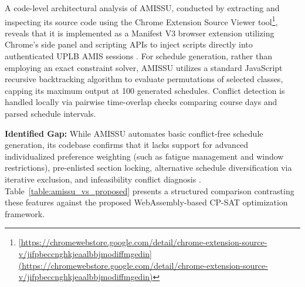 \documentclass{icsthesis}
\begin{document}
\begin{mainmatter}
		A code-level architectural analysis of AMISSU, conducted by extracting and inspecting its source code using the Chrome Extension Source Viewer tool\footnote{\url{[https://chromewebstore.google.com/detail/chrome-extension-source-v/jifpbeccnghkjeaalbbjmodiffmgedin](https://chromewebstore.google.com/detail/chrome-extension-source-v/jifpbeccnghkjeaalbbjmodiffmgedin)}}, reveals that it is implemented as a Manifest V3 browser extension utilizing Chrome's side panel and scripting APIs to inject scripts directly into authenticated UPLB AMIS sessions \citep{amissu2023}. For schedule generation, rather than employing an exact constraint solver, AMISSU utilizes a standard JavaScript recursive backtracking algorithm to evaluate permutations of selected classes, capping its maximum output at 100 generated schedules. Conflict detection is handled locally via pairwise time-overlap checks comparing course days and parsed schedule intervals.
		
		\textbf{Identified Gap:} While AMISSU automates basic conflict-free schedule generation, its codebase confirms that it lacks support for advanced individualized preference weighting (such as fatigue management and window restrictions), pre-enlisted section locking, alternative schedule diversification via iterative exclusion, and infeasibility conflict diagnosis \citep{amissu2023}. Table~\ref{table:amissu_vs_proposed} presents a structured comparison contrasting these features against the proposed WebAssembly-based CP-SAT optimization framework.
		

\end{mainmatter}
\end{document}
